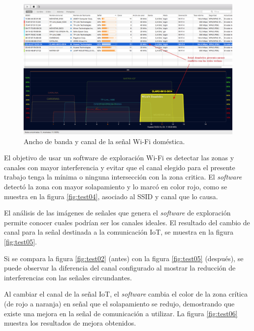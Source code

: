 \begin{landscape} %
\begin{figure}[htpb]
\centering 
\includegraphics[width=1.5\textwidth]{./Figures/wifi/03.png}
\caption{Ancho de banda  y canal de la señal Wi-Fi doméstica.}
\label{fig:test03}
\end{figure}
\end{landscape} %

El objetivo de usar un software de exploración Wi-Fi es detectar las zonas y canales con mayor interferencia y evitar que el canal elegido para el presente trabajo tenga la mínima o ninguna intersección con la zona critica. El \emph{software} detectó la zona con mayor solapamiento y lo marcó en color rojo, como se muestra en la figura \ref{fig:test04}, asociado al SSID y canal que lo causa.

El análisis de las imágenes de señales que genera el \emph{software} de exploración permite conocer cuales podrían ser los canales ideales. El resultado del cambio de canal para la señal destinada a la comunicación IoT, se muestra en la figura \ref{fig:test05}. 

Si se compara la figura \ref{fig:test02} (antes) con la figura \ref{fig:test05} (después), se puede observar la diferencia del canal configurado al mostrar la reducción de interferencias con las señales circundantes.

Al cambiar el canal de la señal IoT, el \emph{software} cambia el color de la zona crítica (de rojo a naranja) en señal que el solapamiento se redujo, demostrando que existe una mejora en la señal de comunicación a utilizar. La figura \ref{fig:test06} muestra los resultados de mejora obtenidos.

